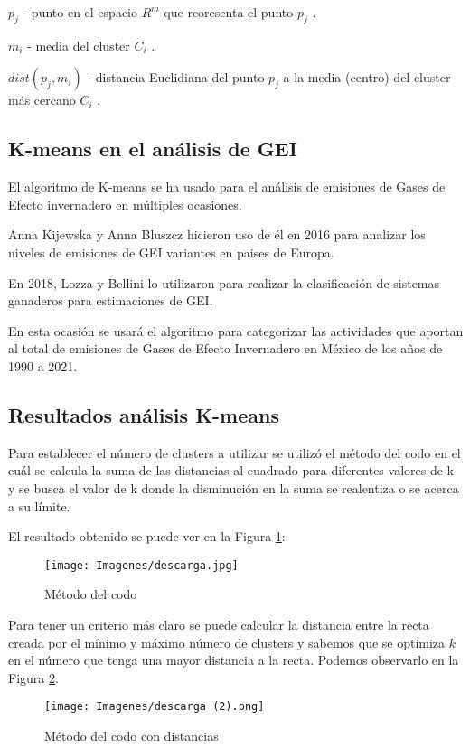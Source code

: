 \documentclass[13.6pt]{article}
\begin{document}
$p_j$ - punto en el espacio $R^m$ que reoresenta el punto $p_j$ .

$m_i$ - media del cluster $C_i$ .

$ dist(p_j , m_i)$ - distancia Euclidiana del punto $p_j$ a la media (centro) del cluster más cercano $C_i$ . 

\citep{KIJEWSKA2016935}



\subsection{K-means en el análisis de GEI}
El algoritmo de K-means se ha usado para el análisis de emisiones de Gases de Efecto invernadero en múltiples ocasiones.

Anna Kijewska y Anna Bluszcz hicieron uso de él en 2016 para analizar los niveles de emisiones de GEI variantes en paises de Europa. \citep{KIJEWSKA2016935}

En 2018, Lozza y Bellini lo utilizaron para realizar la clasificación de sistemas ganaderos para estimaciones de GEI. \citep{lozza2018clasificacion}

En esta ocasión se usará el algoritmo para categorizar las actividades que aportan al total de emisiones de Gases de Efecto Invernadero en México de los años de 1990 a 2021.


\subsection{Resultados análisis K-means}
Para establecer el número de clusters a utilizar se utilizó el método del codo en el cuál se calcula la suma de las distancias al cuadrado para diferentes valores de k y se busca el valor de k donde la disminución en la suma se realentiza o se acerca a su límite. 

El resultado obtenido se puede ver en la Figura \ref{fig: codo}:

\begin{figure}
\texttt{[image: Imagenes/descarga.jpg]}
\caption{Método del codo}
\label{fig: codo}
\end{figure}

Para tener un criterio más claro se puede calcular la distancia entre la recta creada por el mínimo y máximo número de clusters y sabemos que se optimiza $k$ en el número que tenga una mayor distancia a la recta. Podemos observarlo en la Figura \ref{fig: cododist}.

\begin{figure}
\texttt{[image: Imagenes/descarga (2).png]}
\caption{Método del codo con distancias}
\label{fig: cododist}
\end{figure}
\end{document}
